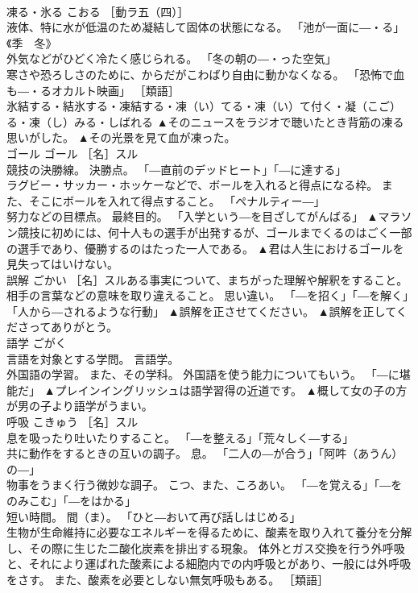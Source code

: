 \documentclass[8pt]{extreport}
\begin{document}
\begin{CJK}{UTF8}{min}
\\	凍る・氷る	こおる	［動ラ五（四）］ 
\\	液体、特に水が低温のため凝結して固体の状態になる。 「池が一面に―・る」《季　冬》 
\\	外気などがひどく冷たく感じられる。 「冬の朝の―・った空気」 
\\	寒さや恐ろしさのために、からだがこわばり自由に動かなくなる。 「恐怖で血も―・るオカルト映画」 ［類語］
\\	氷結する・結氷する・凍結する・凍（い）てる・凍（い）て付く・凝（こご）る・凍（し）みる・しばれる	▲そのニュースをラジオで聴いたとき背筋の凍る思いがした。 ▲その光景を見て血が凍った。
\\	ゴール	ゴール	［名］スル 
\\	競技の決勝線。 決勝点。 「―直前のデッドヒート」「―に達する」 
\\	ラグビー・サッカー・ホッケーなどで、ボールを入れると得点になる枠。 また、そこにボールを入れて得点すること。 「ペナルティー―」 
\\	努力などの目標点。 最終目的。 「入学という―を目ざしてがんばる」	▲マラソン競技に初めには、何十人もの選手が出発するが、ゴールまでくるのはごく一部の選手であり、優勝するのはたった一人である。 ▲君は人生におけるゴールを見失ってはいけない。
\\	誤解	ごかい	［名］スルある事実について、まちがった理解や解釈をすること。 相手の言葉などの意味を取り違えること。 思い違い。 「―を招く」「―を解く」「人から―されるような行動」	▲誤解を正させてください。 ▲誤解を正してくださってありがとう。
\\	語学	ごがく	
\\	言語を対象とする学問。 言語学。 
\\	外国語の学習。 また、その学科。 外国語を使う能力についてもいう。 「―に堪能だ」	▲プレインイングリッシュは語学習得の近道です。 ▲概して女の子の方が男の子より語学がうまい。
\\	呼吸	こきゅう	［名］スル 
\\	息を吸ったり吐いたりすること。 「―を整える」「荒々しく―する」 
\\	共に動作をするときの互いの調子。 息。 「二人の―が合う」「阿吽（あうん）の―」 
\\	物事をうまく行う微妙な調子。 こつ、また、ころあい。 「―を覚える」「―をのみこむ」「―をはかる」 
\\	短い時間。 間（ま）。 「ひと―おいて再び話しはじめる」 
\\	生物が生命維持に必要なエネルギーを得るために、酸素を取り入れて養分を分解し、その際に生じた二酸化炭素を排出する現象。 体外とガス交換を行う外呼吸と、それにより運ばれた酸素による細胞内での内呼吸とがあり、一般には外呼吸をさす。 また、酸素を必要としない無気呼吸もある。 ［類語］

\end{CJK}
\end{document}
